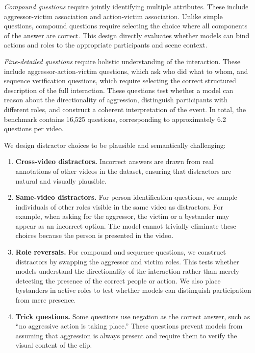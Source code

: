 \textit{Compound questions} require jointly identifying multiple attributes. These include aggressor-victim association and action-victim association. Unlike simple questions, compound questions require selecting the choice where all components of the answer are correct. This design directly evaluates whether models can bind actions and roles to the appropriate participants and scene context.

\textit{Fine-detailed questions} require holistic understanding of the interaction. These include aggressor-action-victim questions, which ask who did what to whom, and sequence verification questions, which require selecting the correct structured description of the full interaction. These questions test whether a model can reason about the directionality of aggression, distinguish participants with different roles, and construct a coherent interpretation of the event. In total, the benchmark contains 16,525 questions, corresponding to approximately 6.2 questions per video.

We design distractor choices to be plausible and semantically challenging:
\begin{enumerate}
    \item \textbf{Cross-video distractors.} Incorrect answers are drawn from real annotations of other videos in the dataset, ensuring that distractors are natural and visually plausible.

    \item \textbf{Same-video distractors.} For person identification questions, we sample individuals of other roles visible in the same video as distractors. For example, when asking for the aggressor, the victim or a bystander may appear as an incorrect option. The model cannot trivially eliminate these choices because the person is presented in the video.

    \item \textbf{Role reversals.} For compound and sequence questions, we construct distractors by swapping the aggressor and victim roles. This tests whether models understand the directionality of the interaction rather than merely detecting the presence of the correct people or action. We also place bystanders in active roles to test whether models can distinguish participation from mere presence.

    \item \textbf{Trick questions.} Some questions use negation as the correct answer, such as ``no aggressive action is taking place.'' These questions prevent models from assuming that aggression is always present and require them to verify the visual content of the clip.
\end{enumerate}

